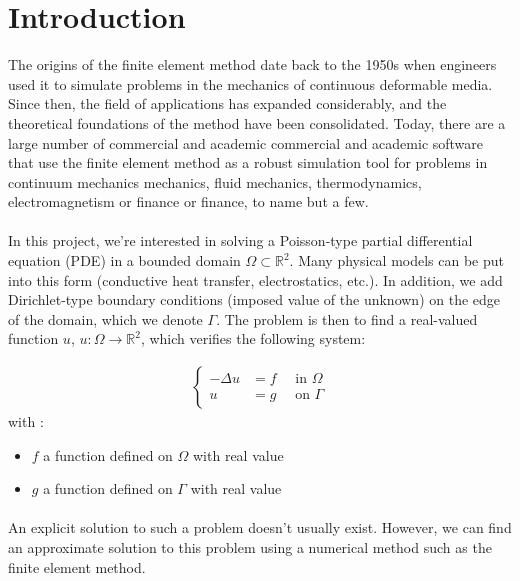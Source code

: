 \documentclass[english,10pt,a4paper]{article}
\begin{document}
\section{Introduction}

The origins of the finite element method date back to the 1950s
when engineers used it to simulate problems in the mechanics
of continuous deformable media. Since then, the field of applications has expanded
considerably, and the theoretical foundations of the method have been
consolidated. Today, there are a large number of commercial and academic
commercial and academic software that use the finite element method
as a robust simulation tool for problems in continuum mechanics
mechanics, fluid mechanics, thermodynamics, electromagnetism or finance
or finance, to name but a few. %


\paragraph{}
In this project, we're interested in solving a Poisson-type partial differential equation (PDE) in a bounded domain $\Omega \subset \mathbb{R}^2$.
Many physical models can be put into this form (conductive heat transfer, electrostatics, etc.).
In addition, we add Dirichlet-type boundary conditions (imposed value of the unknown) on the edge of the domain, which we denote $\Gamma$.
The problem is then to find a real-valued function $u$, $u : \Omega \longrightarrow \mathbb{R}^2$, which verifies the following system:

\begin{eqnarray}
\left\{
  \begin{aligned}
    - \Delta u &= f \quad \text{ in } \Omega \\
    u &= g \quad \text{ on } \Gamma
  \end{aligned}
  \right.
\end{eqnarray}
with :
\begin{itemize}
  \item $f$ a function defined on $\Omega$ with real value
  \item $g$ a function defined on $\Gamma$ with real value
\end{itemize}

\paragraph{}
An explicit solution to such a problem doesn't usually exist. However, we can find an approximate solution to this problem using
a numerical method such as the finite element method.
\end{document}

